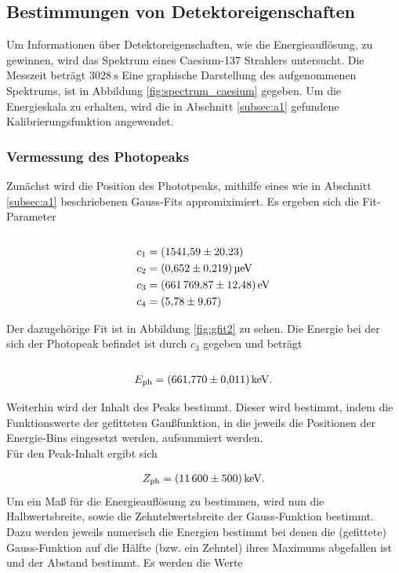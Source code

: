 \FloatBarrier

\subsection{Bestimmungen von Detektoreigenschaften}
\label{subsec:a2}
Um Informationen über Detektoreigenschaften, wie die Energieauflösung, zu gewinnen, wird das Spektrum eines Caesium-137 Strahlers untersucht.
Die Messzeit beträgt $\SI{3028}{\second}$ Eine graphische Darstellung des aufgenommenen
Spektrums, ist in Abbildung \ref{fig:spectrum_caesium} gegeben. Um die Energieskala zu erhalten,
wird die in Abschnitt \ref{subsec:a1} gefundene Kalibrierungsfunktion angewendet.

\subsubsection{Vermessung des Photopeaks}
\label{subsubsec:a21}
Zunächst wird die Position des Phototpeaks, mithilfe eines wie in Abschnitt \ref{subsec:a1} beschriebenen
Gauss-Fits appromiximiert. Es ergeben sich die Fit-Parameter\\ \\

\begin{align*}
  c_{1} &= \SI{1541.59+-20.23}{}\\
  c_{2} &= \SI{0.652+-0.219}{\micro\electronvolt}\\
  c_{3} &= \SI{661769.87+-12.48}{\electronvolt}\\
  c_{4} &= \SI{5.78+-9.67}{}
\end{align*}

Der dazugehörige Fit ist in Abbildung \ref{fig:gfit2} zu sehen.
Die Energie bei der sich der Photopeak befindet ist durch $c_{3}$ gegeben und beträgt\\ \\

\begin{align*}
  E_{\text{ph}} = \SI{661.770+-0.011}{\kilo\electronvolt}.
\end{align*}

Weiterhin wird der Inhalt des Peaks bestimmt. Dieser wird bestimmt, indem die Funktionswerte
der gefitteten Gaußfunktion, in die jeweils die Positionen der Energie-Bins eingesetzt werden, aufsummiert
werden.\\
Für den Peak-Inhalt ergibt sich

\begin{align*}
  Z_\text{ph} = \SI{11600+-500}{\kilo\electronvolt}.
\end{align*}
Um ein Maß für die Energieauflösung zu bestimmen, wird nun die Halbwertsbreite, sowie die Zehntelwertsbreite
der Gauss-Funktion bestimmt. Dazu werden jeweils numerisch die Energien bestimmt bei denen
die (gefittete) Gauss-Funktion auf die Hälfte (bzw. ein Zehntel) ihres Maximums abgefallen ist und der Abstand bestimmt.
Es werden die Werte

